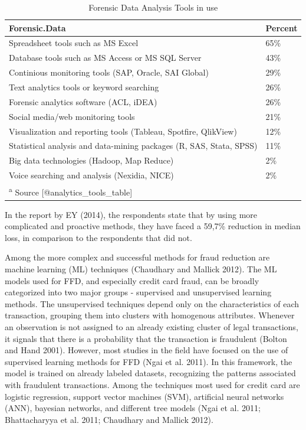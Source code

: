 \documentclass[12pt,]{article}
\begin{document}
\begin{table}

\caption{\label{tab:table analytics}Forensic Data Analysis Tools in use}
\centering
\fontsize{8}{10}\selectfont
\begin{tabular}[t]{ll}
\toprule
Forensic.Data & Percent\\
\midrule
Spreadsheet tools such as MS Excel & 65\%\\
Database tools such as MS Access or MS SQL Server & 43\%\\
Continious monitoring tools  (SAP, Oracle, SAI Global) & 29\%\\
Text analytics tools or keyword searching & 26\%\\
Forensic analytics software (ACL, iDEA) & 26\%\\
\addlinespace
Social media/web monitoring tools & 21\%\\
Visualization and reporting tools (Tableau, Spotfire,                                                     QlikView) & 12\%\\
Statistical analysis and data-mining packages (R,                                                        SAS, Stata, SPSS) & 11\%\\
Big data technologies (Hadoop, Map Reduce) & 2\%\\
Voice searching and analysis (Nexidia, NICE) & 2\%\\
\bottomrule
\multicolumn{2}{l}{\textsuperscript{a} Source [@analytics\_tools\_table]}\\
\end{tabular}
\end{table}

In the report by EY (2014), the respondents state that by using more
complicated and proactive methods, they have faced a 59,7\% reduction in
median loss, in comparison to the respondents that did not.

Among the more complex and successful methods for fraud reduction are
machine learning (ML) techniques (Chaudhary and Mallick 2012). The ML
models used for FFD, and especially credit card fraud, can be broadly
categorized into two major groups - supervised and unsupervised learning
methods. The unsupervised techniques depend only on the characteristics
of each transaction, grouping them into clusters with homogenous
attributes. Whenever an observation is not assigned to an already
existing cluster of legal transactions, it signals that there is a
probability that the transaction is fraudulent (Bolton and Hand 2001).
However, most studies in the field have focused on the use of supervised
learning methods for FFD (Ngai et al. 2011). In this framework, the
model is trained on already labeled datasets, recognizing the patterns
associated with fraudulent transactions. Among the techniques most used
for credit card are logistic regression, support vector machines (SVM),
artificial neural networks (ANN), bayesian networks, and different tree
models (Ngai et al. 2011; Bhattacharyya et al. 2011; Chaudhary and
Mallick 2012).
\end{document}
